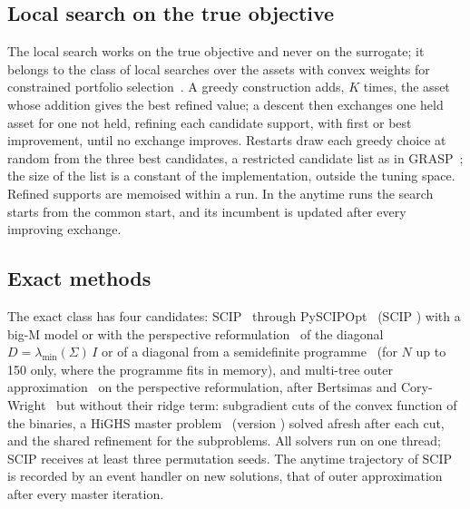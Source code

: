 \subsection{Local search on the true objective}\label{sec:ls}

The local search works on the true objective and never on the surrogate; it belongs to the class of local searches
over the assets with convex weights for constrained portfolio selection~\cite{schaerf2002local,digaspero2011hybrid}. A
greedy construction adds, $K$ times, the asset whose addition gives the best refined value; a descent then exchanges
one held asset for one not held, refining each candidate support, with first or best improvement, until no exchange
improves. Restarts draw each greedy choice at random from the three best candidates, a restricted candidate list as
in GRASP~\cite{feo1995greedy}; the size of the list is a constant of the implementation, outside the tuning space.
Refined supports are memoised within a run. In the
anytime runs the search starts from the common start, and its incumbent is updated after every improving exchange.

\subsection{Exact methods}\label{sec:exact}

The exact class has four candidates: SCIP~\cite{hojny2025scip} through PySCIPOpt~\cite{maher2016pyscipopt}
(SCIP ) with a big-M model or with the perspective reformulation~\cite{frangioni2005perspective,gunluk2010perspective}
of the diagonal $D = \lambda_{\min}(\Sigma)\, I$ or of a diagonal from a semidefinite
programme~\cite{frangioni2007sdp} (for $N$ up to 150 only, where the programme fits in memory), and multi-tree outer
approximation~\cite{duran1986outer} on the perspective reformulation, after Bertsimas and
Cory-Wright~\cite{bertsimas2022scalable} but without their ridge term: subgradient cuts of the convex function of the
binaries, a HiGHS master problem~\cite{huangfu2017parallelizing} (version ) solved afresh after each cut,
and the shared refinement for the subproblems. All
solvers run on one thread; SCIP receives at least three permutation seeds. The anytime trajectory of SCIP is recorded
by an event handler on new solutions, that of outer approximation after every master iteration.
